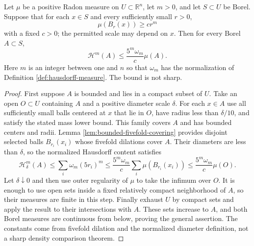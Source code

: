 \begin{proposition}\label{prop:lower-density-hausdorff-comparison}
Let $\mu$ be a positive Radon measure on $U\subset\mathbb R^n$, let $m>0$, and let $S\subset U$ be Borel. Suppose that for each $x\in S$ and every sufficiently small $r>0$,
\[
 \mu(B_r(x))\geq c r^m
\]
with a fixed $c>0$; the permitted scale may depend on $x$. Then for every Borel $A\subset S$,
\[
 \mathcal H^m(A)\leq \frac{5^m\omega_m}{c}\mu(A).
\]
Here $m$ is an integer between one and $n$ so that $\omega_m$ has the normalization of Definition \ref{def:hausdorff-measure}. The bound is not sharp.
\end{proposition}
\begin{proof}
First suppose $A$ is bounded and lies in a compact subset of $U$. Take an open $O\subset U$ containing $A$ and a positive diameter scale $\delta$. For each $x\in A$ use all sufficiently small balls centered at $x$ that lie in $O$, have radius less than $\delta/10$, and satisfy the stated mass lower bound. This family covers $A$ and has bounded centers and radii. Lemma \ref{lem:bounded-fivefold-covering} provides disjoint selected balls $B_{r_i}(x_i)$ whose fivefold dilations cover $A$. Their diameters are less than $\delta$, so the normalized Hausdorff content satisfies
\[
 \mathcal H^m_\delta(A)
 \leq\sum_i\omega_m(5r_i)^m
 \leq\frac{5^m\omega_m}{c}\sum_i\mu(B_{r_i}(x_i))
 \leq\frac{5^m\omega_m}{c}\mu(O).
\]
Let $\delta\downarrow0$ and then use outer regularity of $\mu$ to take the infimum over $O$. It is enough to use open sets inside a fixed relatively compact neighborhood of $A$, so their measures are finite in this step. Finally exhaust $U$ by compact sets and apply the result to their intersections with $A$. These sets increase to $A$, and both Borel measures are continuous from below, proving the general assertion. The constants come from fivefold dilation and the normalized diameter definition, not a sharp density comparison theorem.
\end{proof}

